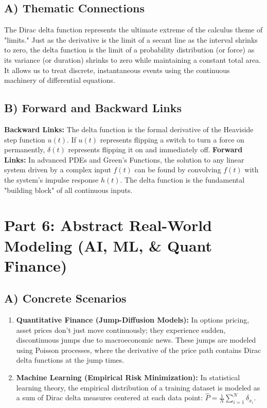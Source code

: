\documentclass[11pt, letterpaper]{article}
\theoremstyle{definition}
\theoremstyle{remark}
\begin{document}
\subsection{A) Thematic Connections}
The Dirac delta function represents the ultimate extreme of the calculus theme of "limits." Just as the derivative is the limit of a secant line as the interval shrinks to zero, the delta function is the limit of a probability distribution (or force) as its variance (or duration) shrinks to zero while maintaining a constant total area. It allows us to treat discrete, instantaneous events using the continuous machinery of differential equations.

\subsection{B) Forward and Backward Links}
\textbf{Backward Links:} The delta function is the formal derivative of the Heaviside step function $u(t)$. If $u(t)$ represents flipping a switch to turn a force on permanently, $\delta(t)$ represents flipping it on and immediately off. 
\textbf{Forward Links:} In advanced PDEs and Green's Functions, the solution to any linear system driven by a complex input $f(t)$ can be found by convolving $f(t)$ with the system's impulse response $h(t)$. The delta function is the fundamental "building block" of all continuous inputs.

\section{Part 6: Abstract Real-World Modeling (AI, ML, \& Quant Finance)}

\subsection{A) Concrete Scenarios}
\begin{enumerate}
    \item \textbf{Quantitative Finance (Jump-Diffusion Models):} In options pricing, asset prices don't just move continuously; they experience sudden, discontinuous jumps due to macroeconomic news. These jumps are modeled using Poisson processes, where the derivative of the price path contains Dirac delta functions at the jump times.
    \item \textbf{Machine Learning (Empirical Risk Minimization):} In statistical learning theory, the empirical distribution of a training dataset is modeled as a sum of Dirac delta measures centered at each data point: $\hat{P} = \frac{1}{N} \sum_{i=1}^N \delta_{x_i}$.
\end{enumerate}
\end{document}
